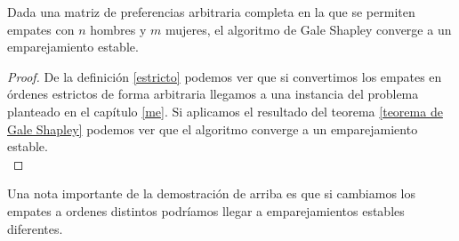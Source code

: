 \begin{cor}
Dada una matriz de preferencias arbitraria completa en la que se permiten empates con $n$ hombres y $m$ mujeres, el algoritmo de Gale Shapley converge a un emparejamiento estable.
\end{cor}
\begin{proof}
De la definición \ref{estricto} podemos ver que si convertimos los empates en órdenes estrictos de forma arbitraria llegamos a una instancia del problema planteado en el capítulo \ref{me}. Si aplicamos el resultado del teorema \ref{teorema de Gale Shapley} podemos ver que el algoritmo converge a un emparejamiento estable. \\
\end{proof}

Una nota importante de la demostración de arriba es que si cambiamos los empates a ordenes distintos podríamos llegar a emparejamientos estables diferentes. 





